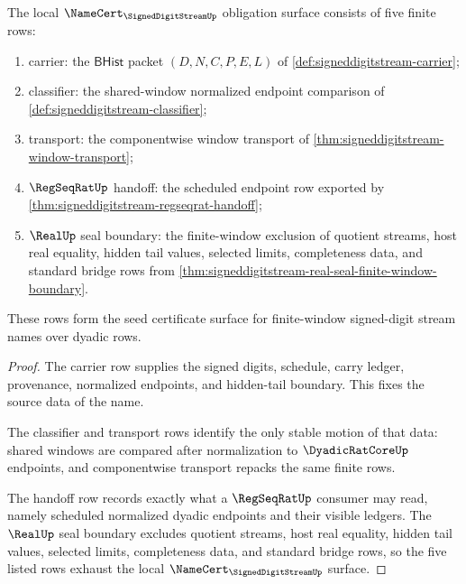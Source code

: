 \begin{theorem}
\label{thm:signeddigitstream-namecert-obligation-surface}
The local $\NameCert_{\SignedDigitStreamUp}$ obligation surface consists of five finite rows:
\begin{enumerate}
\item carrier: the $\mathsf{BHist}$ packet $(D,N,C,P,E,L)$ of \autoref{def:signeddigitstream-carrier};
\item classifier: the shared-window normalized endpoint comparison of \autoref{def:signeddigitstream-classifier};
\item transport: the componentwise window transport of \autoref{thm:signeddigitstream-window-transport};
\item $\RegSeqRatUp$ handoff: the scheduled endpoint row exported by \autoref{thm:signeddigitstream-regseqrat-handoff};
\item $\RealUp$ seal boundary: the finite-window exclusion of quotient streams, host real equality, hidden tail values, selected limits, completeness data, and standard bridge rows from \autoref{thm:signeddigitstream-real-seal-finite-window-boundary}.
\end{enumerate}
These rows form the seed certificate surface for finite-window signed-digit stream names over dyadic rows.
\end{theorem}
\begin{proof}
The carrier row supplies the signed digits, schedule, carry ledger, provenance, normalized endpoints, and hidden-tail boundary. This fixes the source data of the name.

The classifier and transport rows identify the only stable motion of that data: shared windows are compared after normalization to $\DyadicRatCoreUp$ endpoints, and componentwise transport repacks the same finite rows.

The handoff row records exactly what a $\RegSeqRatUp$ consumer may read, namely scheduled normalized dyadic endpoints and their visible ledgers. The $\RealUp$ seal boundary excludes quotient streams, host real equality, hidden tail values, selected limits, completeness data, and standard bridge rows, so the five listed rows exhaust the local $\NameCert_{\SignedDigitStreamUp}$ surface.
\end{proof}

